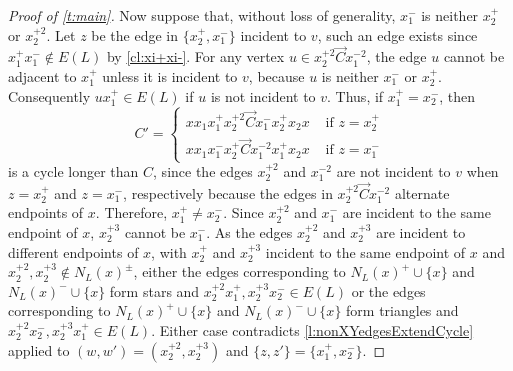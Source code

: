 \documentclass[10pt,a4paper]{amsart}
\newcommand{\ora}{\overrightarrow{C}}
\begin{document}
\begin{proof}[Proof of \cref{t:main}]
Now suppose that, without loss of generality, $x_1^-$ is neither $ x_2^+$ or $x_2^{+2}$.
Let $z$ be the edge in $\{x_2^+,x_1^-\}$ incident to $v$, such an edge exists since $x_1^+ x_1^- \notin E(L)$ by \cref{cl:xi+xi-}. For any vertex $u \in x_2^{+2}\ora x_1^{-2}$, the edge $u$ cannot be adjacent to $x_1^+$ unless it is incident to $v$, because $u$ is neither $x_1^-$ or $x_2^+$. Consequently $u x_1^+ \in E(L)$ if $u$ is not incident to $v$. Thus, if $x_1^+ =x_2^-$, then 
\[
C' = 
\begin{cases}
 x x_1 x_1^+ x_2^{+2} \ora x_1^- x_2^+ x_2 x &\text{ if } z =x_2^+\\
 x x_1 x_1^- x_2^{+} \ora x_1^{-2} x_1^+ x_2 x &\text{ if } z =x_1^-
\end{cases}
\]
is a cycle longer than $C$, since the edges $x_2^{+2}$ and $x_1^{-2}$ are not incident to $v$ when $z=x_2^+$ and $z=x_1^{-}$, respectively because the edges in $x_2^{+2}\ora x_1^{-2}$ alternate endpoints of $x$. 
Therefore, $x_1^+ \neq x_2^-$.
Since $x_2^{+2}$ and $x_1^-$ are incident to the same endpoint of $x$, $x_2^{+3}$ cannot be $ x_1^-$. As the edges $x_2^{+2}$ and $x_{2}^{+3}$ are incident to different endpoints of $x$, with $x_2^+$ and $x_{2}^{+3}$ incident to the same endpoint of $x$ and $x_2^{+2},x_2^{+3} \notin N_L(x)^\pm$, either the edges corresponding to $N_L(x)^+\cup \{x\}$ and $N_L(x)^-\cup \{x\}$ form stars and $x_2^{+2} x_{1}^+  , x_2^{+3} x_2^- \in E(L)$ or the edges corresponding to $N_L(x)^+\cup \{x\}$ and $N_L(x)^-\cup \{x\}$ form triangles and $x_2^{+2} x_{2}^-  , x_2^{+3} x_{1}^+ \in E(L)$.
Either case contradicts \cref{l:nonXYedgesExtendCycle} applied to  $(w,w')=(x_2^{+2},x_2^{+3})$ and $\{z,z'\} = \{x_1^+,x_2^-\}$.
\end{proof}
\end{document}
